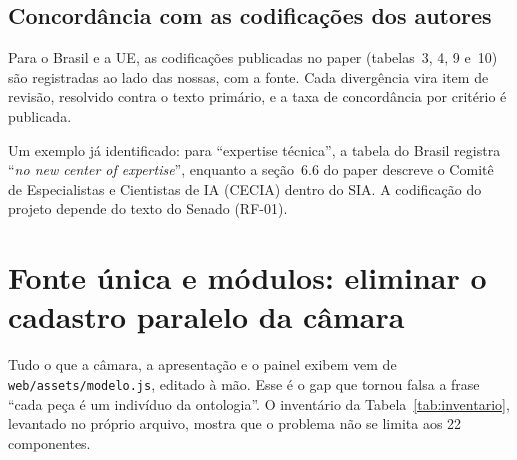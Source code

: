 \documentclass[12pt,a4paper,oneside,english,brazil]{abntex2}
\begin{document}

\section{Concordância com as codificações dos autores}\label{sec:concordancia}
Para o Brasil e a UE, as codificações publicadas no paper (tabelas~3, 4, 9 e~10) são registradas ao lado das nossas, com a fonte. Cada divergência vira item de revisão, resolvido contra o texto primário, e a taxa de concordância por critério é publicada.

Um exemplo já identificado: para ``expertise técnica'', a tabela do Brasil registra ``\emph{no new center of expertise}'', enquanto a seção~6.6 do paper descreve o Comitê de Especialistas e Cientistas de IA (CECIA) dentro do SIA. A codificação do projeto depende do texto do Senado (RF-01).

\chapter{Fonte única e módulos: eliminar o cadastro paralelo da câmara}\label{sec:fonteunica}

Tudo o que a câmara, a apresentação e o painel exibem vem de \texttt{web/assets/modelo.js}, editado à mão. Esse é o gap que tornou falsa a frase ``cada peça é um indivíduo da ontologia''. O inventário da Tabela~\ref{tab:inventario}, levantado no próprio arquivo, mostra que o problema não se limita aos 22 componentes.
\end{document}
